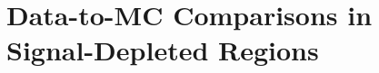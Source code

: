 \section{Data-to-MC Comparisons in Signal-Depleted Regions}
\label{sec:DataMC_SDRs}



\clearpage


\clearpage


\clearpage


\clearpage


\clearpage


\clearpage


\clearpage


\clearpage


\clearpage


%
%
%


